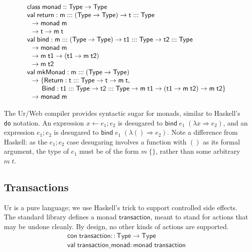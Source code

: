 \documentclass{article}
\newcommand{\cd}[1]{\texttt{#1}}
\newcommand{\mt}[1]{\mathsf{#1}}
\begin{document}
$$\begin{array}{l}
  \mt{class} \; \mt{monad} :: \mt{Type} \to \mt{Type} \\
  \mt{val} \; \mt{return} : \mt{m} ::: (\mt{Type} \to \mt{Type}) \to \mt{t} ::: \mt{Type} \\
  \hspace{.1in} \to \mt{monad} \; \mt{m} \\
  \hspace{.1in} \to \mt{t} \to \mt{m} \; \mt{t} \\
  \mt{val} \; \mt{bind} : \mt{m} ::: (\mt{Type} \to \mt{Type}) \to \mt{t1} ::: \mt{Type} \to \mt{t2} ::: \mt{Type} \\
  \hspace{.1in} \to \mt{monad} \; \mt{m} \\
  \hspace{.1in} \to \mt{m} \; \mt{t1} \to (\mt{t1} \to \mt{m} \; \mt{t2}) \\
  \hspace{.1in} \to \mt{m} \; \mt{t2} \\
  \mt{val} \; \mt{mkMonad} : \mt{m} ::: (\mt{Type} \to \mt{Type}) \\
  \hspace{.1in} \to \{\mt{Return} : \mt{t} ::: \mt{Type} \to \mt{t} \to \mt{m} \; \mt{t}, \\
  \hspace{.3in} \mt{Bind} : \mt{t1} ::: \mt{Type} \to \mt{t2} ::: \mt{Type} \to \mt{m} \; \mt{t1} \to (\mt{t1} \to \mt{m} \; \mt{t2}) \to \mt{m} \; \mt{t2}\} \\
  \hspace{.1in} \to \mt{monad} \; \mt{m}
\end{array}$$

The Ur/Web compiler provides syntactic sugar for monads, similar to Haskell's \cd{do} notation.  An expression $x \leftarrow e_1; e_2$ is desugared to $\mt{bind} \; e_1 \; (\lambda x \Rightarrow e_2)$, and an expression $e_1; e_2$ is desugared to $\mt{bind} \; e_1 \; (\lambda () \Rightarrow e_2)$.  Note a difference from Haskell: as the $e_1; e_2$ case desugaring involves a function with $()$ as its formal argument, the type of $e_1$ must be of the form $m \; \{\}$, rather than some arbitrary $m \; t$.

\subsection{Transactions}

Ur is a pure language; we use Haskell's trick to support controlled side effects.  The standard library defines a monad $\mt{transaction}$, meant to stand for actions that may be undone cleanly.  By design, no other kinds of actions are supported.
$$\begin{array}{l}
  \mt{con} \; \mt{transaction} :: \mt{Type} \to \mt{Type} \\
  \mt{val} \; \mt{transaction\_monad} : \mt{monad} \; \mt{transaction}
\end{array}$$
\end{document}
